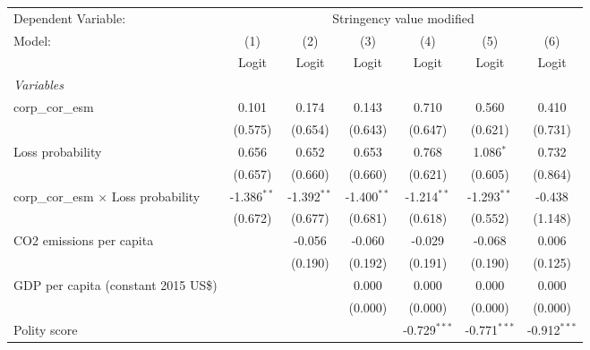 
\begingroup
\centering
\begin{tabular}{lcccccc}
   \toprule
   Dependent Variable: & \multicolumn{6}{c}{Stringency value modified}\\
   Model:                                      & (1)           & (2)           & (3)           & (4)            & (5)            & (6)\\  
                                               &  Logit        & Logit         & Logit         & Logit          & Logit          & Logit\\  
   \midrule
   \emph{Variables}\\
   corp\_cor\_esm                              & 0.101         & 0.174         & 0.143         & 0.710          & 0.560          & 0.410\\   
                                               & (0.575)       & (0.654)       & (0.643)       & (0.647)        & (0.621)        & (0.731)\\   
   Loss probability                            & 0.656         & 0.652         & 0.653         & 0.768          & 1.086$^{*}$    & 0.732\\   
                                               & (0.657)       & (0.660)       & (0.660)       & (0.621)        & (0.605)        & (0.864)\\   
   corp\_cor\_esm $\times$ Loss probability    & -1.386$^{**}$ & -1.392$^{**}$ & -1.400$^{**}$ & -1.214$^{**}$  & -1.293$^{**}$  & -0.438\\   
                                               & (0.672)       & (0.677)       & (0.681)       & (0.618)        & (0.552)        & (1.148)\\   
   CO2 emissions per capita                    &               & -0.056        & -0.060        & -0.029         & -0.068         & 0.006\\   
                                               &               & (0.190)       & (0.192)       & (0.191)        & (0.190)        & (0.125)\\   
   GDP per capita (constant 2015 US\$)         &               &               & 0.000         & 0.000          & 0.000          & 0.000\\   
                                               &               &               & (0.000)       & (0.000)        & (0.000)        & (0.000)\\   
   Polity score                                &               &               &               & -0.729$^{***}$ & -0.771$^{***}$ & -0.912$^{***}$\\   

\end{tabular}
